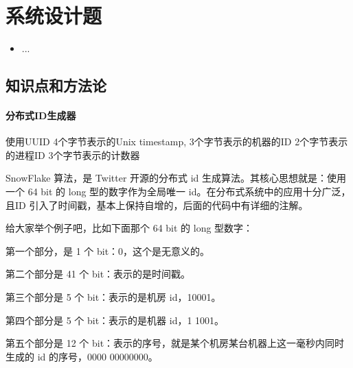 \chapter{系统设计题}
\label{chap1}
\begin{itemize}[noitemsep,topsep=0pt,parsep=0pt,partopsep=0pt]
	\item ...
\end{itemize}

\section{知识点和方法论}
\subsubsection{分布式ID生成器}

使用UUID
4个字节表示的Unix timestamp,
3个字节表示的机器的ID
2个字节表示的进程ID
3个字节表示的计数器

SnowFlake 算法，是 Twitter 开源的分布式 id 生成算法。其核心思想就是：使用一个 64 bit 的 long 型的数字作为全局唯一 id。在分布式系统中的应用十分广泛，且ID 引入了时间戳，基本上保持自增的，后面的代码中有详细的注解。

给大家举个例子吧，比如下面那个 64 bit 的 long 型数字：

第一个部分，是 1 个 bit：0，这个是无意义的。

第二个部分是 41 个 bit：表示的是时间戳。

第三个部分是 5 个 bit：表示的是机房 id，10001。

第四个部分是 5 个 bit：表示的是机器 id，1 1001。

第五个部分是 12 个 bit：表示的序号，就是某个机房某台机器上这一毫秒内同时生成的 id 的序号，0000 00000000。